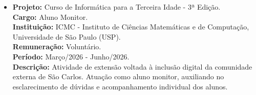 \documentclass[a4paper,10pt]{article}
\begin{document}
\begin{itemize}
\item
\textbf{Projeto:} Curso de Informática para a Terceira Idade - 3ª Edição. \\
\textbf{Cargo:} Aluno Monitor. \\
\textbf{Instituição:} ICMC - Instituto de Ciências Matemáticas e de Computação, Universidade de São Paulo (USP). \\
\textbf{Remuneração:} Voluntário. \\
\textbf{Período:} Março/2026 - Junho/2026. \\
\textbf{Descrição:} Atividade de extensão voltada à inclusão digital da comunidade externa de São Carlos. Atuação como aluno monitor, auxiliando no esclarecimento de dúvidas e acompanhamento individual dos alunos.
\end{itemize}
\end{document}
